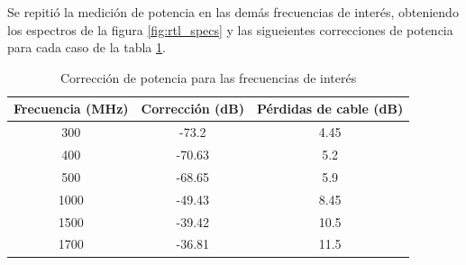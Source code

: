 Se repitió la medición de potencia en las demás frecuencias de interés, obteniendo los espectros de la figura \ref{fig:rtl_specs} y las sigueientes correcciones de potencia para cada caso de la tabla \ref{tab:correccion}.\\

\begin{table}
    \centering
    \begin{tabular}{|c|c|c|}
        \hline
        Frecuencia (MHz) & Corrección (dB) & Pérdidas de cable (dB)\\
        \hline
        300 & -73.2 & 4.45\\
        400 & -70.63 & 5.2\\
        500 & -68.65 & 5.9\\
        1000 & -49.43 & 8.45\\
        1500 & -39.42 & 10.5\\
        1700 & -36.81 & 11.5\\
        \hline
    \end{tabular}
    \caption{Corrección de potencia para las frecuencias de interés}
    \label{tab:correccion}
\end{table}


